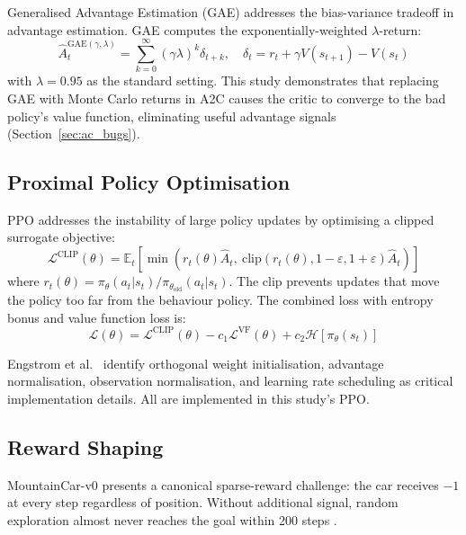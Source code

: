 \documentclass[a4paper,12pt]{article}
\begin{document}
Generalised Advantage Estimation (GAE) \cite{schulman2015high} addresses the bias-variance tradeoff in advantage estimation. GAE computes the exponentially-weighted $\lambda$-return:
\begin{equation}
  \hat{A}_t^{\text{GAE}(\gamma,\lambda)} = \sum_{k=0}^{\infty} (\gamma\lambda)^k \delta_{t+k}, \quad \delta_t = r_t + \gamma V(s_{t+1}) - V(s_t)
\end{equation}
with $\lambda=0.95$ as the standard setting. This study demonstrates that replacing GAE with Monte Carlo returns in A2C causes the critic to converge to the bad policy's value function, eliminating useful advantage signals (Section~\ref{sec:ac_bugs}).

\subsection{Proximal Policy Optimisation}

PPO \cite{schulman2017proximal} addresses the instability of large policy updates by optimising a clipped surrogate objective:
\begin{equation}
  \mathcal{L}^{\text{CLIP}}(\theta) = \mathbb{E}_t\!\left[\min\!\left(r_t(\theta)\hat{A}_t,\ \text{clip}(r_t(\theta), 1-\varepsilon, 1+\varepsilon)\hat{A}_t\right)\right]
\end{equation}
where $r_t(\theta) = \pi_\theta(a_t|s_t)/\pi_{\theta_\text{old}}(a_t|s_t)$. The clip prevents updates that move the policy too far from the behaviour policy. The combined loss with entropy bonus and value function loss is:
\begin{equation}
  \mathcal{L}(\theta) = \mathcal{L}^{\text{CLIP}}(\theta) - c_1 \mathcal{L}^{\text{VF}}(\theta) + c_2 \mathcal{H}[\pi_\theta(s_t)]
\end{equation}

Engstrom et al.\ \cite{engstrom2020implementation} identify orthogonal weight initialisation, advantage normalisation, observation normalisation, and learning rate scheduling as critical implementation details. All are implemented in this study's PPO.

\subsection{Reward Shaping}

MountainCar-v0 \cite{moore1990efficient} presents a canonical sparse-reward challenge: the car receives $-1$ at every step regardless of position. Without additional signal, random exploration almost never reaches the goal within 200 steps \cite{dann2022exploration}.
\end{document}
